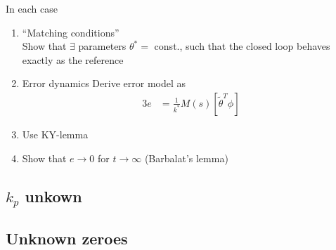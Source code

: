 In each case
\begin{enumerate}[label=\alph*)]
\item ``Matching conditions''\\
    Show that $\exists$ parameters $\theta^* = $ const.,
    such that the closed loop behaves exactly as the reference
\item Error dynamics
    Derive error model as 
    \begin{alignat*}{3}
    e &= \frac{1}{k^*} M(s) \left[ \tilde{\theta}^T \phi \right]
    \end{alignat*}
\item Use KY-lemma
\item Show that $e \rightarrow 0$ for $t \rightarrow \infty$ 
    (Barbalat's lemma)
\end{enumerate}

\subsection{$k_p$ unkown}


\subsection{Unknown zeroes}



